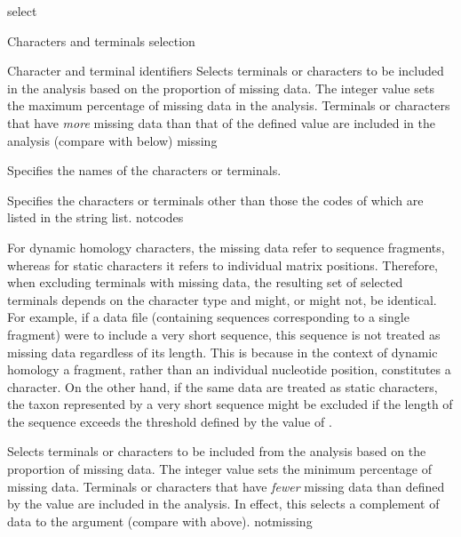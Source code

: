 \begin{command}{select}{}
\begin{arguments}
\begin{argumentgroup}{Characters and terminals selection}
\begin{arguments}
\begin{argumentgroup}{Character and terminal identifiers}
                {Selects terminals or characters to be included in the analysis
                based on the proportion of missing data. The
                integer value sets the maximum percentage of missing
                data in the analysis. Terminals or characters that have \emph{more} missing data
                than that of the defined value are included in the analysis (compare with  below)}
                {missing}
                
                {Specifies the names of the characters or terminals.}
                {}

                {Specifies the characters or terminals other than those the
                codes of which are listed in the string list.}
                {notcodes}
    
            \begin{statement}
                For dynamic homology characters, the missing data refer to
                sequence fragments, whereas for static characters it refers to
                individual matrix positions. Therefore, when excluding
                terminals with missing data, the resulting set of selected
                terminals depends on the character type and might, or
                might not, be identical. For example, if a data file (containing
                sequences corresponding to a single fragment) were to include
                a very short sequence, this sequence is not treated as
                missing data regardless of its length. This is because in the
                context of dynamic homology a fragment, rather than an
                individual nucleotide position, constitutes a character.
                On the other hand, if the same data are treated as static characters,
                the taxon represented by a very short sequence
                might be excluded if the length of the sequence exceeds the
                threshold defined by the value of .
            \end{statement}

                {Selects terminals or characters to be included from the analysis
                based on the proportion of missing data. The
                integer value sets the minimum percentage of missing
                data. Terminals or characters that have  \emph{fewer} missing data
                than defined by the value are included in the analysis.
                In effect, this selects a complement of data to the argument 
                (compare with  above).}
                {notmissing} 
        

\end{argumentgroup}
\end{arguments}
\end{argumentgroup}
\end{arguments}
\end{command}
